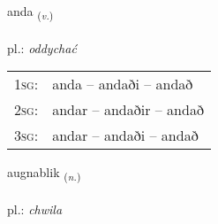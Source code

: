 \documentclass[frontgrid, backgrid]{flacards}\usepackage[]{graphicx}\usepackage[]{xcolor}
\begin{document}
\renewcommand{\blhead}{\vskip5pt {\small\bfseries\footnotesize Sagnorð | czasownik }}
\renewcommand{\bcfoot}{\vskip5pt \hspace{2pt}{\small\bfseries\footnotesize 3K}}


{anda \small{\textsubscript{(\textit{v.})}} \\[1ex] %
\textphonetic{[anta]} \\
pl.: \emph{oddychać} \\  [2ex]
\renewcommand*{\arraystretch}{0.8}
\begin{tabular}{p{1cm}l}
\textsc{1sg}: & anda -- andaði -- andað \\ 
\textsc{2sg}: & andar -- andaðir -- andað \\ 
\textsc{3sg}: & andar -- andaði -- andað \\ 
\end{tabular}
}

\renewcommand{\flhead}{\vskip5pt \fboxsep=0pt {\small\bfseries\footnotesize Nafnorð | rzeczownik}}
\renewcommand{\fcfoot}{\vskip5pt \fboxsep=0pt \hspace{2pt}{\small\bfseries\footnotesize 3K}}

\renewcommand{\blhead}{\vskip5pt {\small\bfseries\footnotesize Nafnorð | rzeczownik }}
\renewcommand{\bcfoot}{\vskip5pt \hspace{2pt}{\small\bfseries\footnotesize 3K}}


{augnablik \small{\textsubscript{(\textit{n.})}} \\[1ex] %
\textphonetic{[œiknaplɪk]} \\
pl.: \emph{chwila} \\  [2ex]
\renewcommand*{\arraystretch}{0.8}
}
\end{document}
